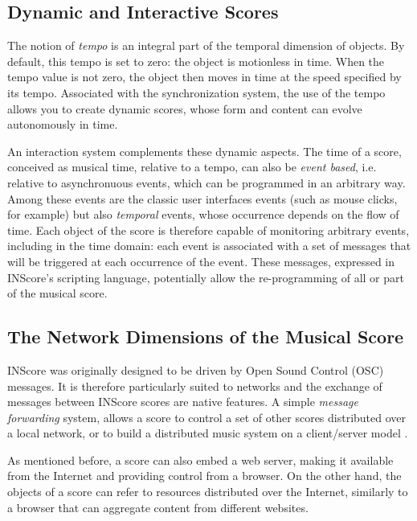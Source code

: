 \documentclass{article}
\begin{document}
\subsection{Dynamic and Interactive Scores}

The notion of \emph{tempo} is an integral part of the temporal dimension of objects. By default, this tempo is set to zero: the object is motionless in time. When the tempo value is not zero, the object then moves in time at the speed specified by its tempo. Associated with the synchronization system, the use of the tempo allows you to create dynamic scores, whose form and content can evolve autonomously in time.

An interaction system complements these dynamic aspects. The time of a score, conceived as musical time, relative to a tempo, can also be \emph{event based}, i.e. relative to asynchronuous events, which can be programmed in an arbitrary way. Among these events are the classic user interfaces events (such as mouse clicks, for example) but also \emph{temporal} events, whose occurrence depends on the flow of time. Each object of the score is therefore capable of monitoring arbitrary events, including in the time domain: each event is associated with a set of messages that will be triggered at each occurrence of the event. These messages, expressed in INScore's scripting language, potentially allow the re-programming of all or part of the musical score.

\subsection{The Network Dimensions of the Musical Score}

INScore was originally designed to be driven by Open Sound Control (OSC) messages. It is therefore particularly suited to networks and the exchange of messages between INScore scores are native features. A simple \emph{message forwarding} system, allows a score to control a set of other scores distributed over a local network, or to build a distributed music system on a client/server model \cite{slavko_zagorac_2018_1289685}.

As mentioned before, a score can also embed a web server, making it available from the Internet and providing control from a browser. On the other hand, the objects of a score can refer to resources distributed over the Internet, similarly to a browser that can aggregate content from different websites.
\end{document}
